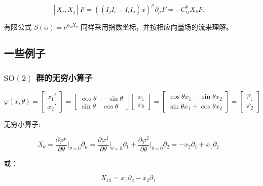 \begin{equation}
\left[X_i,X_j\right]F=\left(\left(I_jI_i-I_iI_j\right)x\right)^\mu\partial_\mu F=-C_{ij}^kX_kF.
\end{equation}

有限公式 $S\left(\alpha\right)=\mathrm{e}^{\alpha_kX_k}$ 同样采用指数坐标，并按相应向量场的流来理解。

\subsection{一些例子}

\subsubsection*{\texorpdfstring{$\mathrm{SO}\left(2\right)$ 群的无穷小算子}{SO(2) 群的无穷小算子}}

\begin{equation}
\varphi\left(x,\theta\right)
=\begin{bmatrix}
x_1' \\
x_2'
\end{bmatrix}
=\begin{bmatrix}
\cos\theta &-\sin\theta \\
\sin\theta &\cos\theta
\end{bmatrix}
\begin{bmatrix}
x_1 \\
x_2
\end{bmatrix}
=\begin{bmatrix}
\cos\theta x_1 - \sin\theta x_2 \\
\sin\theta x_1 + \cos\theta x_2
\end{bmatrix}
=\begin{bmatrix}
\varphi_1 \\
\varphi_2
\end{bmatrix}
\end{equation}

无穷小算子:

\begin{equation}
X_\theta
=\frac{\partial \varphi^\mu }{\partial \theta } \bigg|_{\theta=0} \partial_\mu
=\frac{\partial \varphi^1}{\partial \theta}\bigg|_{\theta=0 }\partial_1 +\frac{\partial\varphi^2 }{\partial \theta } \bigg|_{\theta=0} \partial_2
=-x_2\partial_1 + x_1\partial_2
\end{equation}


或：

\begin{equation}
X_{12} = x_1\partial_2-x_2\partial_1
\end{equation}

